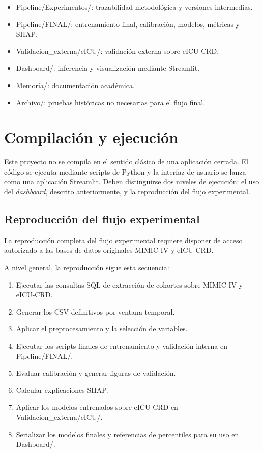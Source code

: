 \documentclass[
  spanish,
  a4paper,
  12pt,
  twoside]{memoir}
\newcommand{\ruta}[1]{{\sffamily #1}}
\begin{document}
\begin{itemize}
  \item \ruta{Pipeline/Experimentos/}: trazabilidad metodológica y versiones intermedias.
  \item \ruta{Pipeline/FINAL/}: entrenamiento final, calibración, modelos, métricas y SHAP.
  \item \ruta{Validacion\_externa/eICU/}: validación externa sobre eICU-CRD.
  \item \ruta{Dashboard/}: inferencia y visualización mediante Streamlit.
  \item \ruta{Memoria/}: documentación académica.
  \item \ruta{Archivo/}: pruebas históricas no necesarias para el flujo final.
\end{itemize}

\section{Compilación y ejecución}

Este proyecto no se compila en el sentido clásico de una aplicación cerrada. El código se ejecuta mediante scripts de Python y la interfaz de usuario se lanza como una 
aplicación Streamlit. Deben distinguirse dos niveles de ejecución: el uso del \textit{dashboard}, descrito anteriormente, y la reproducción del flujo experimental.

\subsection*{Reproducción del flujo experimental}

La reproducción completa del flujo experimental requiere disponer de acceso autorizado a las bases de datos originales MIMIC-IV y eICU-CRD.

A nivel general, la reproducción sigue esta secuencia:

\begin{enumerate}
  \item Ejecutar las consultas SQL de extracción de cohortes sobre MIMIC-IV y eICU-CRD.
  \item Generar los CSV definitivos por ventana temporal.
  \item Aplicar el preprocesamiento y la selección de variables.
  \item Ejecutar los scripts finales de entrenamiento y validación interna en \ruta{Pipeline/FINAL/}.
  \item Evaluar calibración y generar figuras de validación.
  \item Calcular explicaciones SHAP.
  \item Aplicar los modelos entrenados sobre eICU-CRD en \ruta{Validacion\_externa/eICU/}.
  \item Serializar los modelos finales y referencias de percentiles para su uso en \ruta{Dashboard/}.
\end{enumerate}
\end{document}
